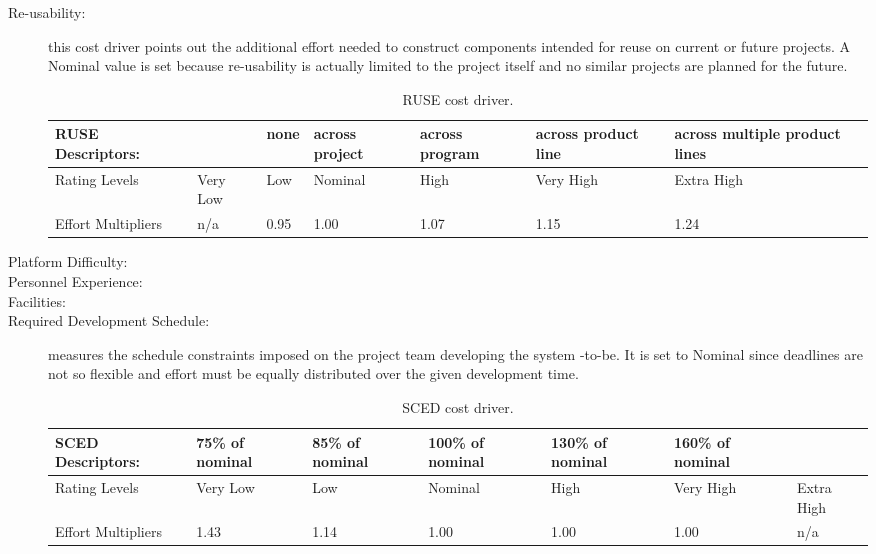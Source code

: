\begin{description}
\item[Re-usability:] this cost driver points out the additional effort needed to construct components intended for reuse on current or future projects. A Nominal value is set because re-usability is actually limited to the project itself and no similar projects are planned for the future. 

\begin{table}[H]
	\begin{adjustwidth}{-.5in}{-.5in}
    \centering
    \begin{tabular}{p{3.8cm}|p{1cm}|p{1cm}|p{1.5cm}|p{1.6cm}|p{1.5cm}|p{2cm}}
    	\hline
        RUSE Descriptors: & & none & across project & across program & across product line & across multiple product lines \\
        \hline
        Rating Levels & Very Low & Low & Nominal & High & Very High & Extra High \\
        \hline
        Effort Multipliers & n/a & 0.95 & 1.00 & 1.07 & 1.15 & 1.24 \\
        \hline
    \end{tabular}
    \caption{RUSE cost driver.}
    \end{adjustwidth}
\end{table}

\item[Platform Difficulty:]
\item[Personnel Experience:]
\item[Facilities:]
\item[Required Development Schedule:] measures the schedule constraints imposed on the project team developing the system -to-be. It is set to Nominal since deadlines are not so flexible and effort must be equally distributed over the given development time.

\begin{table}[H]
	\begin{adjustwidth}{-.5in}{-.5in}
    \centering
    \begin{tabular}{p{3.6cm}|p{1.5cm}|p{1.5cm}|p{1.5cm}|p{1.5cm}|p{1.5cm}|p{1cm}}
    	\hline
        SCED Descriptors: & 75\% of nominal & 85\% of nominal & 100\% of nominal & 130\% of nominal & 160\% of nominal & \\
        \hline
        Rating Levels & Very Low & Low & Nominal & High & Very High & Extra High \\
        \hline
        Effort Multipliers & 1.43 & 1.14 & 1.00 & 1.00 & 1.00 & n/a \\
        \hline
    \end{tabular}
    \caption{SCED cost driver.}
    \end{adjustwidth}
\end{table}

\end{description}

